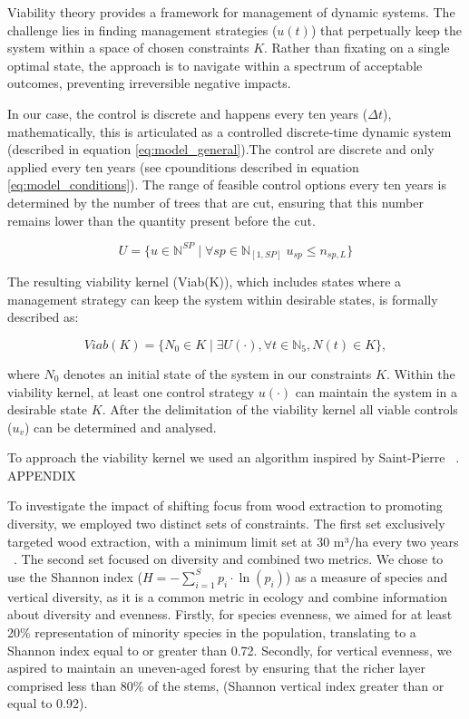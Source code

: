 \documentclass{article}
\begin{document}
Viability theory provides a framework for management of dynamic systems. The challenge lies in finding management strategies (\(u(t)\)) that perpetually keep the system within a space of chosen constraints $K$. Rather than fixating on a single optimal state, the approach is to navigate within a spectrum of acceptable outcomes, preventing irreversible negative impacts.

In our case, the control is discrete and happens every ten years ($\Delta t$), mathematically, this is articulated as a controlled discrete-time dynamic system (described in equation \eqref{eq:model_general}).The control are discrete and only applied every ten years (see cpounditions described in equation \eqref{eq:model_conditions}). The range of feasible control options every ten years is determined by the number of trees that are cut, ensuring that this number remains lower than the quantity present before the cut.

\begin{equation}
     U = \{u \in \mathbb{N}^{SP} \mid \forall sp \in \mathbb{N}_{[1,SP]} \; u_{sp} \leq n_{sp,L}\}
\end{equation}

The resulting viability kernel (Viab(K)), which includes states where a management strategy can keep the system within desirable states, is formally described as:

\begin{equation}
    Viab(K) = \{N_0 \in K \mid\exists U(\cdot), \forall t \in \mathbb{N}_5, N(t) \in K\},
\end{equation}

where \(N_0\) denotes an initial state of the system in our constraints $K$. Within the viability kernel, at least one control strategy $u(\cdot)$ can maintain the system in a desirable state $K$. After the delimitation of the viability kernel all viable controls (\(u_v\)) can be determined and analysed.

To approach the viability kernel we used an algorithm inspired by Saint-Pierre ~\autocite{saint-pierreApproximationViabilityKernel1994}. APPENDIX

To investigate the impact of shifting focus from wood extraction to promoting diversity, we employed two distinct sets of constraints. The first set exclusively targeted wood extraction, with a minimum limit set at 30 m³/ha every two years ~\autocite{IGN}. The second set focused on diversity and combined two metrics. We chose to use the Shannon index ($H = -\sum_{i=1}^{S} p_i \cdot \ln(p_i)$) as a measure of species and vertical diversity, as it is a common metric in ecology and combine information about diversity and evenness. Firstly, for species evenness, we aimed for at least 20\% representation of minority species in the population, translating to a Shannon index equal to or greater than 0.72. Secondly, for vertical evenness, we aspired to maintain an uneven-aged forest by ensuring that the richer layer comprised less than 80\% of the stems, (Shannon vertical index greater than or equal to 0.92).
\\
\end{document}
